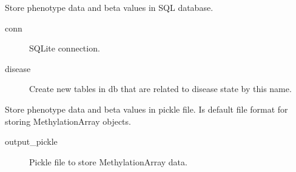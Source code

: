 \documentclass[letterpaper,10pt,english]{sphinxmanual}
\begin{document}
\begin{fulllineitems}
\begin{fulllineitems}
\label{\detokenize{index:pymethylprocess.MethylationDataTypes.MethylationArray.write_db}}
Store phenotype data and beta values in SQL database.
\begin{description}
\item[{conn}] \leavevmode
SQLite connection.

\item[{disease}] \leavevmode
Create new tables in db that are related to disease state by this name.

\end{description}

\end{fulllineitems}


\begin{fulllineitems}
\label{\detokenize{index:pymethylprocess.MethylationDataTypes.MethylationArray.write_pickle}}
Store phenotype data and beta values in pickle file.
Is default file format for storing MethylationArray objects.
\begin{description}
\item[{output\_pickle}] \leavevmode
Pickle file to store MethylationArray data.

\end{description}

\end{fulllineitems}


\end{fulllineitems}

\end{document}
